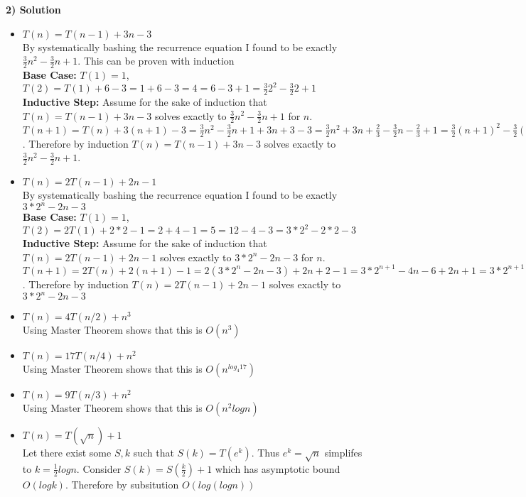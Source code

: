 \documentclass[11pt]{article}
\begin{document}
\textbf{2) Solution}
\begin{itemize}
\item \textbf{$T(n)=T(n-1)+3n-3$}\\
By systematically bashing the recurrence equation I found to be exactly $\frac{3}{2}n^2 - \frac{3}{2}n +1$. This can be proven with induction\\
\textbf{Base Case:} $T(1)=1$, $T(2)=T(1)+6-3 = 1+6-3=4=6-3+1=\frac{3}{2}2^2 - \frac{3}{2}2 +1$\\
\textbf{Inductive Step:} Assume for the sake of induction that $T(n)=T(n-1)+3n-3$ solves exactly to $\frac{3}{2}n^2 - \frac{3}{2}n +1$ for $n$. $T(n+1) = T(n) + 3(n+1) -3 = \frac{3}{2}n^2 - \frac{3}{2}n +1 +3n +3 -3 =  \frac{3}{2}n^2 +3n + \frac{2}{3} - \frac{3}{2}n - \frac{2}{3} +1 = \frac{3}{2}(n+1)^2 - \frac{3}{2}(n+1) +1$. Therefore by induction $T(n)=T(n-1)+3n-3$ solves exactly to $\frac{3}{2}n^2 - \frac{3}{2}n +1$.
\item \textbf{$T(n)=2T(n-1)+2n-1$}\\
By systematically bashing the recurrence equation I found to be exactly $3*2^n -2n -3$\\
\textbf{Base Case:} $T(1)=1$, $T(2)=2T(1)+2*2-1=2+4-1=5=12-4-3=3*2^2 -2*2 -3$\\
\textbf{Inductive Step:} Assume for the sake of induction that $T(n)=2T(n-1)+2n-1$ solves exactly to $3*2^n -2n -3$ for $n$. $T(n+1) = 2T(n) + 2(n+1) -1 = 2(3*2^n -2n -3) +2n +2 -1 = 3*2^{n+1} - 4n - 6 + 2n +1 = 3*2^{n+1} - 2(n+1) -3$. Therefore by induction $T(n)=2T(n-1)+2n-1$ solves exactly to $3*2^n -2n -3$
\item \textbf{$T(n)=4T(n/2)+n^3$}\\
Using Master Theorem shows that this is $O(n^3)$
\item \textbf{$T(n)=17T(n/4)+n^2$}\\
Using Master Theorem shows that this is $O(n^{log_4 17})$
\item \textbf{$T(n)=9T(n/3)+n^2$}\\
Using Master Theorem shows that this is $O(n^2log n)$
\item \textbf{$T(n)=T(\sqrt{n})+1$}\\
Let there exist some $S,k$ such that $S(k) = T(e^k)$. Thus $e^k = \sqrt {n}$ simplifes to $k = \frac{1}{2} log n$. Consider $S(k) = S(\frac{k}{2}) + 1$ which has asymptotic bound $O(log k)$. Therefore by subsitution $O(log(log n))$ 
\end{itemize}
\end{document}
